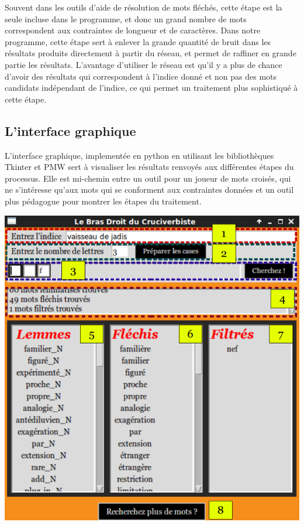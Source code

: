 Souvent dans les outils d'aide de résolution de mots fléchés, cette étape est la seule incluse dans le programme, et donc un grand nombre de mots correspondent aux contraintes de longueur et de caractères. Dans notre programme, cette étape sert à enlever la grande quantité de bruit dans les résultats produits directement à partir du réseau, et permet de raffiner en grande partie les résultats. L'avantage d'utiliser le réseau est qu'il y a plus de chance d'avoir des résultats qui correspondent à l'indice donné et non pas des mots candidats indépendant de l'indice, ce qui permet un traitement plus sophistiqué à cette étape.

\subsection{L'interface graphique}

L'interface graphique, implementée en python en utilisant les bibliothèques 
Tkinter et PMW sert à visualiser les résultats renvoyés aux différentes 
étapes du processus. Elle est mi-chemin entre un outil pour un joueur de mots 
croisés, qui ne s'intéresse qu'aux mots qui se conforment aux contraintes 
données et un outil plus pédagogue pour montrer les étapes du traitement.

\begin{center}
\includegraphics{CrossWordInterface.png}
\end{center}


